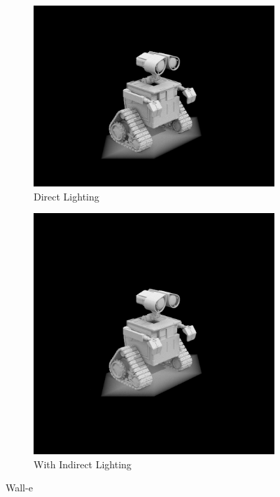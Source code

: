 \documentclass{article}
\begin{document}
\begin{figure}[htb!]
\begin{subfigure}[h]{0.4\textwidth}
\includegraphics[width=\textwidth]{task4/wall-e_direct.png}
\caption{Direct Lighting}
\end{subfigure}
\hfill\vrule\hfill
\begin{subfigure}[h]{0.4\textwidth}
\includegraphics[width=\textwidth]{task4/wall-e.png}
\caption{With Indirect Lighting}
\end{subfigure}%

\caption[f2]{Wall-e}
\end{figure}
\end{document}
